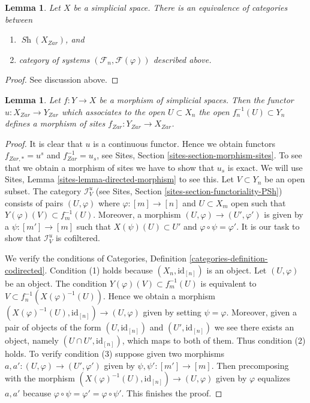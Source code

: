 \documentclass{stacks-project}
\theoremstyle{plain}
\newtheorem{lemma}[subsection]{Lemma}
\theoremstyle{definition}
\theoremstyle{remark}
\numberwithin{equation}{subsection}
\def\Sh{\mathop{\mathit{Sh}}\nolimits}
\begin{document}
\begin{lemma}
\label{lemma-describe-sheaves-simplicial-site}
Let $X$ be a simplicial space. There is an equivalence of
categories between
\begin{enumerate}
\item $\Sh(X_{Zar})$, and
\item category of systems $(\mathcal{F}_n, \mathcal{F}(\varphi))$
described above.
\end{enumerate}
\end{lemma}

\begin{proof}
See discussion above.
\end{proof}

\begin{lemma}
\label{lemma-simplicial-space-site-functorial}
Let $f : Y \to X$ be a morphism of simplicial spaces.
Then the functor $u : X_{Zar} \to Y_{Zar}$
which associates to the open $U \subset X_n$ the open
$f_n^{-1}(U) \subset Y_n$ defines a morphism of sites
$f_{Zar} : Y_{Zar} \to X_{Zar}$.
\end{lemma}

\begin{proof}
It is clear that $u$ is a continuous functor. Hence we obtain functors
$f_{Zar, *} = u^s$ and $f_{Zar}^{-1} = u_s$, see
Sites, Section \ref{sites-section-morphism-sites}.
To see that we obtain a morphism of sites we have to show
that $u_s$ is exact. We will use
Sites, Lemma \ref{sites-lemma-directed-morphism} to see this.
Let $V \subset Y_n$ be an open subset. The category
$\mathcal{I}_V^u$ (see Sites, Section \ref{sites-section-functoriality-PSh})
consists of pairs $(U, \varphi)$ where
$\varphi : [m] \to [n]$ and $U \subset X_m$ open such that
$Y(\varphi)(V) \subset f_m^{-1}(U)$. Moreover, a morphism
$(U, \varphi) \to (U', \varphi')$ is given by a
$\psi : [m'] \to [m]$ such that $X(\psi)(U) \subset U'$
and $\varphi \circ \psi = \varphi'$.
It is our task to show that $\mathcal{I}_V^u$ is cofiltered.

\medskip\noindent
We verify the conditions of
Categories, Definition \ref{categories-definition-codirected}.
Condition (1) holds because $(X_n, \text{id}_{[n]})$ is an object.
Let $(U, \varphi)$ be an object. The condition
$Y(\varphi)(V) \subset f_m^{-1}(U)$ is equivalent to
$V \subset f_n^{-1}(X(\varphi)^{-1}(U))$. Hence we obtain a morphism
$(X(\varphi)^{-1}(U), \text{id}_{[n]}) \to (U, \varphi)$ given
by setting $\psi = \varphi$. Moreover, given a pair of objects
of the form $(U, \text{id}_{[n]})$ and $(U', \text{id}_{[n]})$
we see there exists an object, namely $(U \cap U', \text{id}_{[n]})$,
which maps to both of them. Thus condition (2) holds.
To verify condition (3) suppose given two morphisms
$a, a': (U, \varphi) \to (U', \varphi')$ given by $\psi, \psi' : [m'] \to [m]$.
Then precomposing with the morphism
$(X(\varphi)^{-1}(U), \text{id}_{[n]}) \to (U, \varphi)$ given
by $\varphi$ equalizes $a, a'$ because
$\varphi \circ \psi = \varphi' = \varphi \circ \psi'$.
This finishes the proof.
\end{proof}
\end{document}
